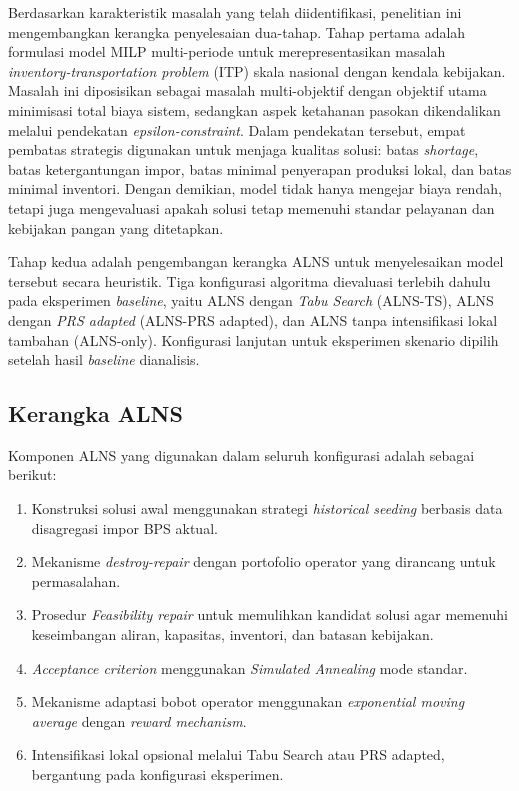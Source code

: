 \documentclass{file/TA-ITS}
\theoremstyle{definition}
\theoremstyle{definition}
\theoremstyle{plain}
\begin{document}
Berdasarkan karakteristik masalah yang telah diidentifikasi, penelitian ini mengembangkan kerangka penyelesaian dua-tahap. Tahap pertama adalah formulasi model MILP multi-periode untuk merepresentasikan masalah \textit{inventory-transportation problem} (ITP) skala nasional dengan kendala kebijakan. Masalah ini diposisikan sebagai masalah multi-objektif dengan objektif utama minimisasi total biaya sistem, sedangkan aspek ketahanan pasokan dikendalikan melalui pendekatan \textit{epsilon-constraint}. Dalam pendekatan tersebut, empat pembatas strategis digunakan untuk menjaga kualitas solusi: batas \textit{shortage}, batas ketergantungan impor, batas minimal penyerapan produksi lokal, dan batas minimal inventori. Dengan demikian, model tidak hanya mengejar biaya rendah, tetapi juga mengevaluasi apakah solusi tetap memenuhi standar pelayanan dan kebijakan pangan yang ditetapkan.

Tahap kedua adalah pengembangan kerangka ALNS untuk menyelesaikan model tersebut secara heuristik. Tiga konfigurasi algoritma dievaluasi terlebih dahulu pada eksperimen \textit{baseline}, yaitu ALNS dengan \textit{Tabu Search} (ALNS-TS), ALNS dengan \textit{PRS adapted} (ALNS-PRS adapted), dan ALNS tanpa intensifikasi lokal tambahan (ALNS-only). Konfigurasi lanjutan untuk eksperimen skenario dipilih setelah hasil \textit{baseline} dianalisis.

\subsection{Kerangka ALNS}

Komponen ALNS yang digunakan dalam seluruh konfigurasi adalah sebagai berikut:
\begin{enumerate}
    \item Konstruksi solusi awal menggunakan strategi \textit{historical seeding} berbasis data disagregasi impor BPS aktual.
    \item Mekanisme \textit{destroy-repair} dengan portofolio operator yang dirancang untuk permasalahan.
    \item Prosedur \textit{Feasibility repair} untuk memulihkan kandidat solusi agar memenuhi keseimbangan aliran, kapasitas, inventori, dan batasan kebijakan.
    \item \textit{Acceptance criterion} menggunakan \textit{Simulated Annealing} mode standar.
    \item Mekanisme adaptasi bobot operator menggunakan \textit{exponential moving average} dengan \textit{reward mechanism}.
    \item Intensifikasi lokal opsional melalui Tabu Search atau PRS adapted, bergantung pada konfigurasi eksperimen.
\end{enumerate}
\end{document}
